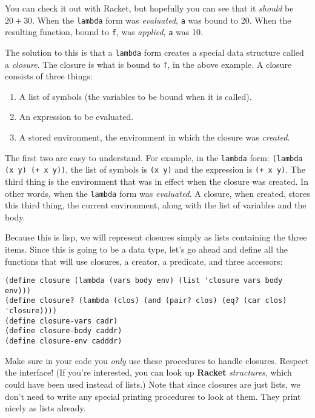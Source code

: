 \documentclass[letterpaper,12pt]{article}
\begin{document}
  You can check it out with Racket, but hopefully you can see that it
  \emph{should} be $20 + 30$.  When the \texttt{lambda} form was
  \emph{evaluated}, \texttt{a} was bound to 20.  When the resulting function,
  bound to \texttt{f}, was \emph{applied}, \texttt{a} was 10.

  The solution to this is that a \texttt{lambda} form creates a special data
  structure called a \emph{closure}.  The closure is what is bound to \texttt{f},
  in the above example.  A closure consists of three things:
  \begin{enumerate}
  \item A list of symbols (the variables to be bound when it is called).
  \item An expression to be evaluated.
  \item A stored environment, the environment in which the closure was
    \emph{created}.
  \end{enumerate}
  The first two are easy to understand.  For example, in the \texttt{lambda}
  form: \texttt{(lambda (x y) (+ x y))}, the list of symbols is \texttt{(x y)}
  and the expression is \texttt{(+ x y)}.  The third thing is the environment
  that was in effect when the closure was created.  In other words, when the
  \texttt{lambda} form was \emph{evaluated}.  A closure, when created, stores
  this third thing, the current environment, along with the list of variables
  and the body.

  Because this is lisp, we will represent closures simply as lists containing
  the three items.  Since this is going to be a data type, let's go ahead and
  define all the functions that will use closures, a creator, a predicate, and
  three accessors:
\begin{Verbatim}[frame=single,label=Closure Data Type]
(define closure (lambda (vars body env) (list 'closure vars body env)))
(define closure? (lambda (clos) (and (pair? clos) (eq? (car clos) 'closure))))
(define closure-vars cadr)
(define closure-body caddr)
(define closure-env cadddr)  
\end{Verbatim}
  Make sure in your code you {\em only} use these procedures to handle closures.
  Respect the interface!  (If you're interested, you can look up \textbf{Racket}
  {\em structures}, which could have been used instead of lists.)  Note that
  since closures are just lists, we don't need to write any special printing
  procedures to look at them.  They print nicely as lists already.
\end{document}
